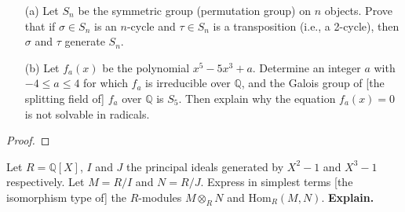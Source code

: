 \documentclass[openany]{book}
\begin{document}
\begin{prob}
    \begin{itemize}
        \item[(a)] Let \(S_n\) be the symmetric group (permutation group) on \(n\) objects. Prove that if \(\sigma \in S_n\) is an \(n\)-cycle and \(\tau \in S_n\) is a transposition (i.e., a 2-cycle), then \(\sigma\) and \(\tau\) generate \(S_n\).
        \item[(b)] Let \(f_a(x)\) be the polynomial \(x^5 - 5x^3 + a\). Determine an integer \(a\) with \(-4 \leq a \leq 4\) for which \(f_a\) is irreducible over \(\mathbb{Q}\), and the Galois group of [the splitting field of] \(f_a\) over \(\mathbb{Q}\) is \(S_5\). Then explain why the equation \(f_a(x) = 0\) is not solvable in radicals.
    \end{itemize}
\end{prob}
\begin{proof}
    
\end{proof}



\begin{prob}
    Let \(R = \mathbb{Q}[X]\), \(I\) and \(J\) the principal ideals generated by \(X^2 - 1\) and \(X^3 - 1\) respectively. Let \(M = R/I\) and \(N = R/J\). Express in simplest terms [the isomorphism type of] the \(R\)-modules \(M \otimes_R N\) and \(\text{Hom}_R(M, N)\). \textbf{Explain.}
\end{prob}
\end{document}
